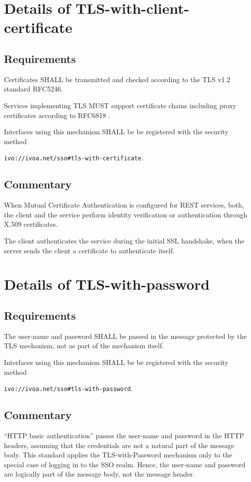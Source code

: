 \documentclass[11pt,a4paper]{ivoa}
\begin{document}
\section{Details of TLS-with-client-certificate}
\subsection{Requirements}
Certificates SHALL be transmitted and checked according to the TLS v1.2 standard RFC5246.

Services implementing TLS MUST support certificate chains including proxy certificates according to RFC6818  \citep{std:RFC6818}.

Interfaces using this mechanism SHALL be be registered with the security method 

\texttt{ivo://ivoa.net/sso\#tls-with-certificate}.

\subsection{Commentary}
When Mutual Certificate Authentication is configured for REST services, both, the client and the service perform 
identity verification or authentication through X.509 certificates. 

The client authenticates the service during the initial SSL handshake, when the server sends the client a certificate to authenticate itself.

\section{Details of TLS-with-password}
\subsection{Requirements}
The user-name and password SHALL be passed in the message protected by the TLS mechanism, 
not as part of the mechanism itself. 

Interfaces using this mechanism SHALL be be registered with the security method 

\texttt{ivo://ivoa.net/sso\#tls-with-password}.

\subsection{Commentary}
``HTTP basic authentication'' passes the user-name and password in the HTTP headers, 
assuming that the credentials are not a natural part of the message body. 
This standard applies the TLS-with-Password mechanism only to the special case of logging in to the SSO realm. 
Hence, the user-name and password are logically part of the message body, not the message header.
\end{document}
